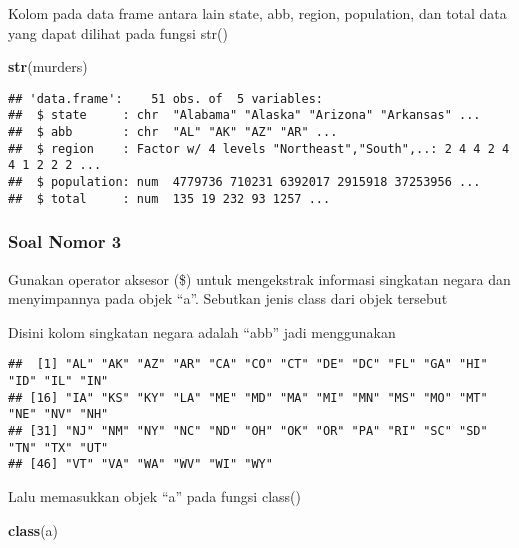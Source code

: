\documentclass[
]{article}
\newenvironment{Shaded}{\begin{snugshade}}{\end{snugshade}}
\newcommand{\KeywordTok}[1]{\textcolor[rgb]{0.13,0.29,0.53}{\textbf{#1}}}
\newcommand{\NormalTok}[1]{#1}
\newcommand{\OperatorTok}[1]{\textcolor[rgb]{0.81,0.36,0.00}{\textbf{#1}}}
\newcommand{\StringTok}[1]{\textcolor[rgb]{0.31,0.60,0.02}{#1}}
\begin{document}
Kolom pada data frame antara lain state, abb, region, population, dan
total data yang dapat dilihat pada fungsi str()

\begin{Shaded}
\begin{Highlighting}[]
\KeywordTok{str}\NormalTok{(murders)}
\end{Highlighting}
\end{Shaded}

\begin{verbatim}
## 'data.frame':    51 obs. of  5 variables:
##  $ state     : chr  "Alabama" "Alaska" "Arizona" "Arkansas" ...
##  $ abb       : chr  "AL" "AK" "AZ" "AR" ...
##  $ region    : Factor w/ 4 levels "Northeast","South",..: 2 4 4 2 4 4 1 2 2 2 ...
##  $ population: num  4779736 710231 6392017 2915918 37253956 ...
##  $ total     : num  135 19 232 93 1257 ...
\end{verbatim}

\hypertarget{soal-nomor-3}{%
\subsubsection{Soal Nomor 3}\label{soal-nomor-3}}

Gunakan operator aksesor (\$) untuk mengekstrak informasi singkatan
negara dan menyimpannya pada objek ``a''. Sebutkan jenis class dari
objek tersebut

Disini kolom singkatan negara adalah ``abb'' jadi menggunakan

\begin{Shaded}
\end{Shaded}

\begin{verbatim}
##  [1] "AL" "AK" "AZ" "AR" "CA" "CO" "CT" "DE" "DC" "FL" "GA" "HI" "ID" "IL" "IN"
## [16] "IA" "KS" "KY" "LA" "ME" "MD" "MA" "MI" "MN" "MS" "MO" "MT" "NE" "NV" "NH"
## [31] "NJ" "NM" "NY" "NC" "ND" "OH" "OK" "OR" "PA" "RI" "SC" "SD" "TN" "TX" "UT"
## [46] "VT" "VA" "WA" "WV" "WI" "WY"
\end{verbatim}

Lalu memasukkan objek ``a'' pada fungsi class()

\begin{Shaded}
\begin{Highlighting}[]
\KeywordTok{class}\NormalTok{(a)}
\end{Highlighting}
\end{Shaded}
\end{document}
